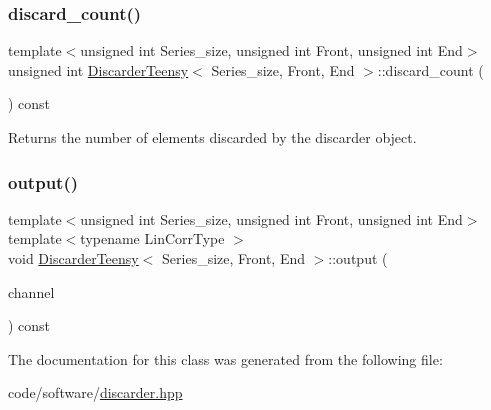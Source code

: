 \subsubsection{\texorpdfstring{discard\+\_\+count()}{discard\_count()}}
{\footnotesize\ttfamily template$<$unsigned int Series\+\_\+size, unsigned int Front, unsigned int End$>$ \\
unsigned int \hyperlink{classDiscarderTeensy}{Discarder\+Teensy}$<$ Series\+\_\+size, Front, End $>$\+::discard\+\_\+count (\begin{DoxyParamCaption}{ }\end{DoxyParamCaption}) const\hspace{0.3cm}{\ttfamily [inline]}}



Returns the number of elements discarded by the discarder object. 

\mbox{\label{classDiscarderTeensy_ae7f8709724630ac3cc82a7a3ee202f2c}} 
\subsubsection{\texorpdfstring{output()}{output()}}
{\footnotesize\ttfamily template$<$unsigned int Series\+\_\+size, unsigned int Front, unsigned int End$>$ \\
template$<$typename Lin\+Corr\+Type $>$ \\
void \hyperlink{classDiscarderTeensy}{Discarder\+Teensy}$<$ Series\+\_\+size, Front, End $>$\+::output (\begin{DoxyParamCaption}\item[{const Lin\+Corr\+Type \&}]{channel }\end{DoxyParamCaption}) const\hspace{0.3cm}{\ttfamily [inline]}}



The documentation for this class was generated from the following file\+:\begin{DoxyCompactItemize}
\item 
code/software/\hyperlink{discarder_8hpp}{discarder.\+hpp}\end{DoxyCompactItemize}
